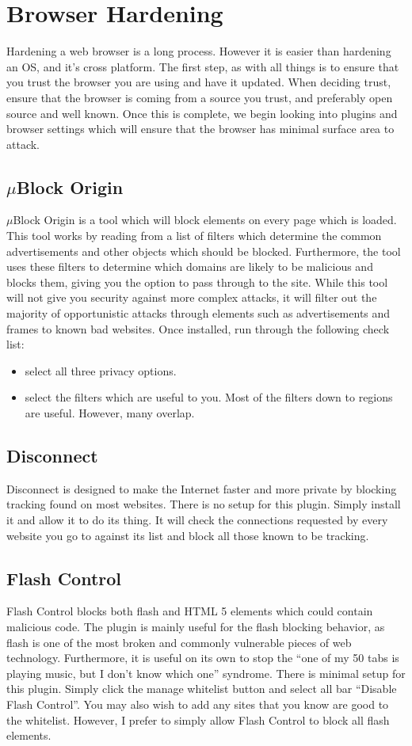 	\section{Browser Hardening}
		Hardening a web browser is a long process. However it is easier than hardening an OS, and it's cross platform.
		The first step, as with all things is to ensure that you trust the browser you are using and have it updated.
		When deciding trust, ensure that the browser is coming from a source you trust, and preferably open source and well known.
		Once this is complete, we begin looking into plugins and browser settings which will ensure that the browser has minimal surface area to attack.
		\subsection{$\mu{}$Block Origin}
			$\mu$Block Origin is a tool which will block elements on every page which is loaded.
			This tool works by reading from a list of filters which determine the common advertisements and other objects which should be blocked.
			Furthermore, the tool uses these filters to determine which domains are likely to be malicious and blocks them, giving you the option to pass through to the site.
			While this tool will not give you security against more complex attacks, it will filter out the majority of opportunistic attacks through elements such as advertisements and frames to known bad websites.
			Once installed, run through the following check list:
			\begin{itemize}
				\item select all three privacy options.
				\item select the filters which are useful to you.
					Most of the filters down to regions are useful. However, many overlap.
			\end{itemize}
		\subsection{Disconnect}
			Disconnect is designed to make the Internet faster and more private by blocking tracking found on most websites.
			There is no setup for this plugin. Simply install it and allow it to do its thing.
			It will check the connections requested by every website you go to against its list and block all those known to be tracking.
		\subsection{Flash Control}
			Flash Control blocks both flash and HTML 5 elements which could contain malicious code.
			The plugin is mainly useful for the flash blocking behavior, as flash is one of the most broken and commonly vulnerable pieces of web technology.
			Furthermore, it is useful on its own to stop the ``one of my 50 tabs is playing music, but I don't know which one'' syndrome.
			There is minimal setup for this plugin. Simply click the manage whitelist button and select all bar ``Disable Flash Control''.
			You may also wish to add any sites that you know are good to the whitelist.
			However, I prefer to simply allow Flash Control to block all flash elements.

